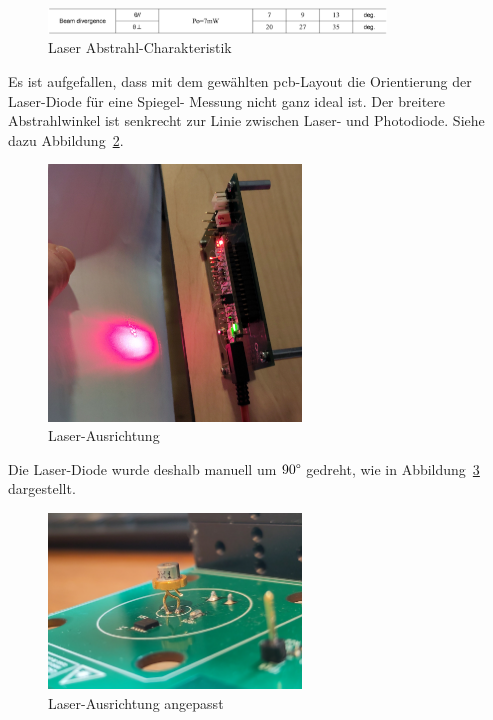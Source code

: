 \begin{figure}[H]
    \centering
    \includegraphics[width=0.8\textwidth]{graphics/laser_abstrahl_charakteristik.pdf}
    \caption[Laser Abstrahl-Charakteristik]{Laser Abstrahl-Charakteristik \cite{rohm2019rld65nzx1_datasheet}}\label{fig:laser_abstrahl_charakteristik}
\end{figure}

Es ist aufgefallen, dass mit dem gewählten \acrshort{pcb}-Layout die Orientierung der Laser-Diode für eine Spiegel-
Messung nicht ganz ideal ist. Der breitere Abstrahlwinkel ist senkrecht zur Linie zwischen Laser- und Photodiode. Siehe
dazu Abbildung~\ref{fig:laser_ausrichtung}.

\begin{figure}[H]
    \centering
    \includegraphics[width=0.6\textwidth]{graphics/laser_ausrichtung.jpg}
    \caption{Laser-Ausrichtung}\label{fig:laser_ausrichtung}
\end{figure}

Die Laser-Diode wurde deshalb manuell um $90\degree$ gedreht, wie in Abbildung~\ref{fig:laser_ausrichtung_angepasst}
dargestellt.

\begin{figure}[H]
    \centering
    \includegraphics[width=0.6\textwidth]{graphics/laser_ausrichtung_angepasst.jpg}
    \caption{Laser-Ausrichtung angepasst}\label{fig:laser_ausrichtung_angepasst}
\end{figure}

